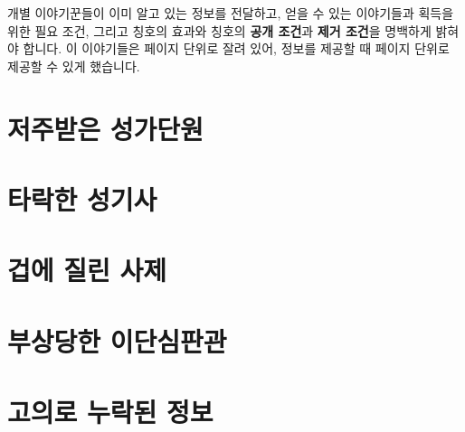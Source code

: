 \documentclass{report}
\begin{document}
	개별 이야기꾼들이 이미 알고 있는 정보를 전달하고, 얻을 수 있는 이야기들과 획득을 위한 필요 조건, 그리고 칭호의 효과와 칭호의 \textbf{공개 조건}과 \textbf{제거 조건}을 명백하게 밝혀야 합니다. 이 이야기들은 페이지 단위로 잘려 있어, 정보를 제공할 때 페이지 단위로 제공할 수 있게 했습니다.
	
	\pagebreak \hypertarget{cursed-bard}{}
	\section{저주받은 성가단원}
	
	\pagebreak \hypertarget{corrupt-paladin}{}
	\section{타락한 성기사}
	
	\pagebreak \hypertarget{cowardly-priest}{}
	\section{겁에 질린 사제}
	
	\pagebreak \hypertarget{hurt-rogue}{}
	\section{부상당한 이단심판관}
		
	\pagebreak
	\section{고의로 누락된 정보}
		
	
\end{document}
